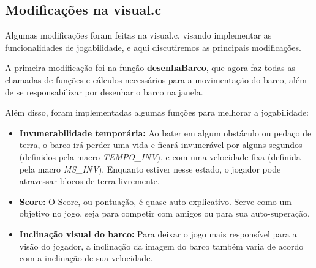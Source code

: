 \documentclass[11pt]{article}
\begin{document}
\subsection{Modificações na visual.c}

Algumas modificações foram feitas na visual.c, visando implementar as funcionalidades de jogabilidade, e aqui discutiremos as principais modificações.

A primeira modificação foi na função \textbf{desenhaBarco}, que agora faz todas as chamadas de funções e cálculos necessários para a movimentação do barco, além de se responsabilizar por desenhar o barco na janela.

Além disso, foram implementadas algumas funções para melhorar a jogabilidade:

\begin{itemize}

\item \textbf{Invunerabilidade temporária:} Ao bater em algum obstáculo ou pedaço de terra, o barco irá perder uma vida e ficará invunerável por alguns segundos (definidos pela macro \textit{TEMPO\_{}INV}), e com uma velocidade fixa (definida pela macro \textit{MS\_{}INV}). Enquanto estiver nesse estado, o jogador pode atravessar blocos de terra livremente.

\item \textbf{Score:} O Score, ou pontuação, é quase auto-explicativo. Serve como um objetivo no jogo, seja para competir com amigos ou para sua auto-superação.

\item \textbf{Inclinação visual do barco:} Para deixar o jogo mais responsível para a visão do jogador, a inclinação da imagem do barco também varia de acordo com a inclinação de sua velocidade.


\end{itemize}
\end{document}

